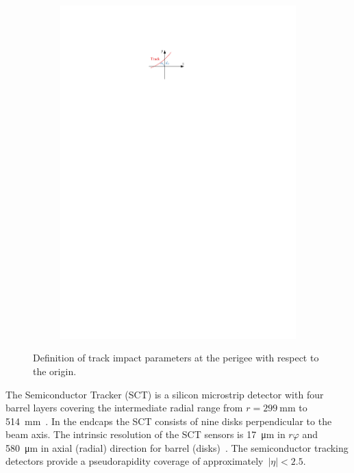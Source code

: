 \begin{figure}[htb]
\begin{subfigure}[t]{0.48\textwidth}
    \centering \includegraphics{./figures/atlas/impact_params_d0.pdf}
    \label{fig:transverse_impact_param}
  \end{subfigure}
  \caption[Definition of track impact parameters]{Definition of track impact
    parameters at the perigee with respect to the origin.}
  \label{fig:impact_params}
\end{figure}

The Semiconductor Tracker (SCT) is a silicon microstrip detector with four
barrel layers covering the intermediate radial range from
$r = \SI{299}{\milli\metre}$ to \SI{514}{mm}~\cite{atlas_detector}. In the
endcaps the SCT consists of nine disks perpendicular to the beam axis. The
intrinsic resolution of the SCT sensors is \SI{17}{\micro\metre} in $r\varphi$
and \SI{580}{\micro\metre} in axial (radial) direction for barrel
(disks)~\cite{atlas_detector}. The semiconductor tracking detectors provide a
pseudorapidity coverage of approximately~$|\eta| < 2.5$.

